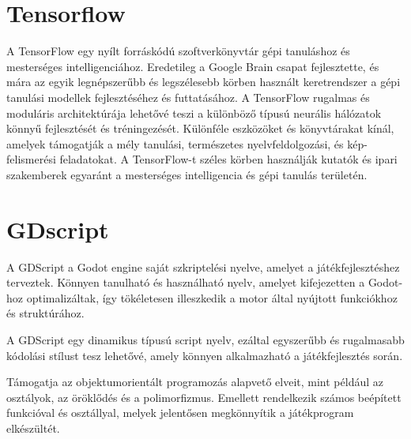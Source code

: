 \section{Tensorflow}
A TensorFlow egy nyílt forráskódú szoftverkönyvtár gépi tanuláshoz és mesterséges intelligenciához. Eredetileg a Google Brain csapat fejlesztette, és mára az egyik legnépszerűbb és legszélesebb körben használt keretrendszer a gépi tanulási modellek fejlesztéséhez és futtatásához. A TensorFlow rugalmas és moduláris architektúrája lehetővé teszi a különböző típusú neurális hálózatok könnyű fejlesztését és tréningezését. Különféle eszközöket és könyvtárakat kínál, amelyek támogatják a mély tanulási, természetes nyelvfeldolgozási, és kép-felismerési feladatokat. A TensorFlow-t széles körben használják kutatók és ipari szakemberek egyaránt a mesterséges intelligencia és gépi tanulás területén.

\section{GDscript}
A GDScript a Godot engine saját szkriptelési nyelve, amelyet a játékfejlesztéshez terveztek. 
Könnyen tanulható és használható nyelv, amelyet kifejezetten a Godot-hoz optimalizáltak, így tökéletesen illeszkedik a motor által nyújtott funkciókhoz és struktúrához.

A GDScript egy dinamikus típusú script nyelv, ezáltal egyszerűbb és rugalmasabb kódolási stílust tesz lehetővé, amely könnyen alkalmazható a játékfejlesztés során.

Támogatja az objektumorientált programozás alapvető elveit, mint például az osztályok, az öröklődés és a polimorfizmus. Emellett rendelkezik számos beépített funkcióval és osztállyal, melyek jelentősen megkönnyítik a játékprogram elkészültét.
